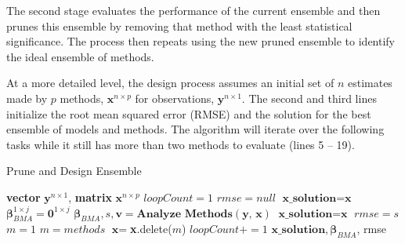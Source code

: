 \documentclass[journal=jpcbfk, manuscript=article]{achemso}
\newcommand{\+}[1]{\ensuremath{\mathbf{#1}}}
\newcommand{\rev}[1]{#1}
\begin{document}
\rev{The second stage evaluates the performance of the current ensemble and then prunes this ensemble by removing that method with the least statistical significance.
The process then repeats using the new pruned ensemble to identify the ideal ensemble of methods.}

\rev{At a more detailed level, the design process assumes an initial set of $n$ estimates made by $p$ methods, $\textbf{x}^{n \times p}$ for observations, $\textbf{y}^{n \times 1}$.
The second and third lines initialize the root mean squared error (RMSE) and the solution for the best ensemble of models and methods.
The algorithm will iterate over the following tasks while it still has more than two methods to evaluate (lines 5 -- 19).}

\begin{table}[t] 
	\begin{minipage}[t]{0.45\linewidth}\centering 
		\begin{algorithm}[H] 
			\footnotesize 
			\caption{\newline \rev{Prune and Design Ensemble}} \label{Method:Alg1} 
			\begin{algorithmic}[1] 
				{\scriptsize 
				\REQUIRE \textbf{vector} $\textbf{y}^{n \times 1}$, \textbf{matrix} $\textbf{x}^{n \times p}$\; 
				\vspace{2.5mm} 
				\STATE $loopCount = 1$\; 
				\STATE $rmse = null$\; 
				\STATE $\textbf{x\_solution} = \textbf{x}$\; 
				\STATE $\boldsymbol{\beta}_{BMA}^{1 \times j} = \textbf{0}^{1 \times j}$ \; 
				\; 
					\STATE $\boldsymbol{\beta}_{BMA}, s, \textbf{v} = \textbf{Analyze Methods}(\textbf{y, x})$\; 
					\; 
						\STATE $\textbf{x\_solution} = \textbf{x}$\; 
						\STATE $rmse = s$\; 
					\ENDIF\; 
					\STATE $m = 1$\; 
					\; 
						\; 
							\STATE $m = methods$\;
						\ENDIF\;
					\ENDFOR\;
					\STATE $\textbf{x} = $\textbf{x}.delete($m$)
					\;
					\STATE $loopCount += 1$\;
				\ENDWHILE\;
				\RETURN $\textbf{x\_solution},\boldsymbol{\beta}_{BMA}$, rmse\;} 
			\end{algorithmic}
		\end{algorithm}
	\end{minipage}
	\hspace{0.5cm}
	\begin{minipage}[t]{0.45\linewidth}

\end{minipage}
\end{table}
\end{document}
